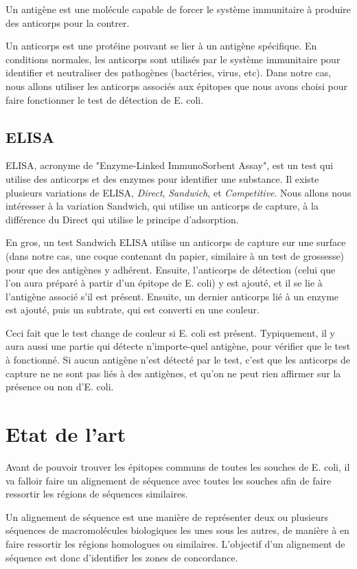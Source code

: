 \documentclass{article}
\begin{document}
      Un antigène est une molécule capable de forcer le système immunitaire à produire des anticorps pour la contrer.
      
      Un anticorps est une protéine pouvant se lier à un antigène spécifique. En conditions normales, les anticorps sont utilisés par le système immunitaire pour identifier et neutraliser des pathogènes (bactéries, virus, etc). Dans notre cas, nous allons utiliser les anticorps associés aux épitopes que nous avons choisi pour faire fonctionner le test de détection de E. coli.
      
    \subsection{ELISA}
      ELISA, acronyme de "Enzyme-Linked ImmunoSorbent Assay", est un test qui utilise des anticorps et des enzymes pour identifier une substance. Il existe plusieurs variations de ELISA, \textit{Direct}, \textit{Sandwich}, et \textit{Competitive}. Nous allons nous intéresser à la variation Sandwich, qui utilise un anticorps de capture, à la différence du Direct qui utilise le principe d'adsorption.
      
      En gros, un test Sandwich ELISA utilise un anticorps de capture sur une surface (dans notre cas, une coque contenant du papier, similaire à un test de grossesse) pour que des antigènes y adhérent. Ensuite, l'anticorps de détection (celui que l'on aura préparé à partir d'un épitope de E. coli) y est ajouté, et il se lie à l'antigène associé s'il est présent. Ensuite, un dernier anticorps lié à un enzyme est ajouté, puis un subtrate, qui est converti en une couleur.
      
      Ceci fait que le test change de couleur si E. coli est présent. Typiquement, il y aura aussi une partie qui détecte n'importe-quel antigène, pour vérifier que le test à fonctionné. Si aucun antigène n'est détecté par le test, c'est que les anticorps de capture ne ne sont pas liés à des antigènes, et qu'on ne peut rien affirmer sur la présence ou non d'E. coli.
      
  \section{Etat de l'art}
Avant de pouvoir trouver les épitopes communs de toutes les souches de E. coli, il va falloir faire un alignement de séquence avec toutes les souches afin de faire ressortir les régions de séquences similaires.

Un alignement de séquence est une manière de représenter deux ou plusieurs séquences de macromolécules biologiques les unes sous les autres, de manière à en faire ressortir les régions homologues ou similaires. L'objectif d'un alignement de séquence est donc d'identifier les zones de concordance.
\end{document}
